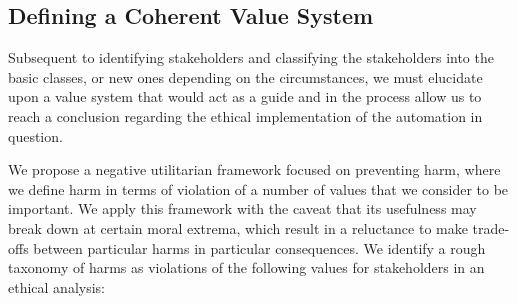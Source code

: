\subsection{Defining a Coherent Value System}
\label{sec:-value}
Subsequent to identifying stakeholders and classifying the stakeholders 
into the basic classes, or new ones depending on the circumstances, we 
must elucidate upon a value system that would act as a guide and in the 
process allow us to reach a conclusion regarding the ethical 
implementation of the automation in question.

We propose a negative utilitarian framework focused on preventing harm, 
where we define harm in terms of violation of a number of values that we 
consider to be important.  We apply this framework with the caveat that 
its usefulness may break down at certain moral extrema, which result in 
a reluctance to make trade-offs between particular harms in particular 
consequences. We identify a rough taxonomy of harms as violations of 
the following values for stakeholders in an ethical analysis:

